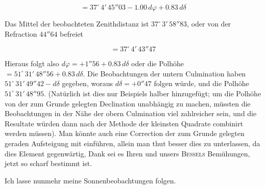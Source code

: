 \[ = 37^\circ\,4'\,45''03 - 1.00\,d\varphi + 0.83\,d\delta \]

\par\indent Das Mittel der beobachteten Zenithdistanz ist $37^\circ\,3'\,58''83$, oder von der Refraction $44''64$ befreiet

\[ = 37^\circ\,4'\,43''47 \]

\par\indent Hieraus folgt also $d\varphi = +1''56 + 0.83\,d\delta$ oder die Polhöhe $= 51^\circ\,31'\,48''56 + 0.83\,d\delta$. Die Beobachtungen der untern Culmination haben $51^\circ\,31'\,49''42 - d\delta$ gegeben, woraus $d\delta = +0''47$ folgen würde, und die Polhöhe $51^\circ\,31'\,48''95$. (Natürlich ist dies nur Beispiels halber hinzugefügt; um die Polhöhe von der zum Grunde gelegten Declination unabhängig zu machen, müssten die Beobachtungen in der Nähe der obern Culmination viel zahlreicher sein, und die Resultate würden dann nach der Methode der kleinsten Quadrate combinirt werden müssen). Man könnte auch eine Correction der zum Grunde gelegten geraden Aufsteigung mit einführen, allein man thut besser dies zu unterlassen, da dies Element gegenwärtig, Dank sei es Ihren und unsers \textsc{Bessels} Bemühungen, jetzt so scharf bestimmt ist.

\par\indent Ich lasse nunmehr meine Sonnenbeobachtungen folgen.

